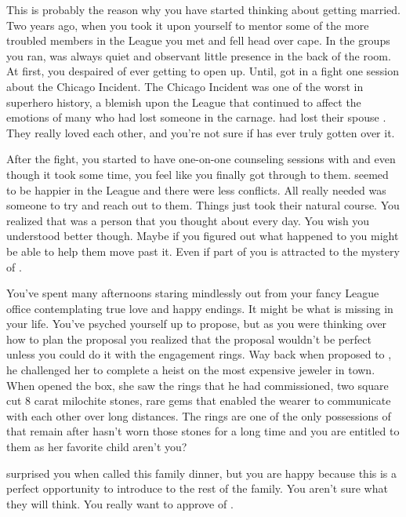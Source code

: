 \documentclass[char]{LRSguildcamp1}
\begin{document}
This is probably the reason why you have started thinking about getting married. Two years ago, when you took it upon yourself to mentor some of the more troubled members in the League you met \cYS{} and fell head over cape. In the groups you ran, \cYS{\they} was always quiet and observant little presence in the back of the room. At first, you despaired of ever getting \cYS{\them} to open up. Until, \cYS{\they} got in a fight one session about the Chicago Incident. The Chicago Incident was one of the worst in superhero history, a blemish upon the League that continued to affect the emotions of many who had lost someone in the carnage. \cArchitect{} had lost their spouse \cAS{\intro}. They really loved each other, and you're not sure if \cArchitect{\they} has ever truly gotten over it. 

After the fight, you started to have one-on-one counseling sessions with \cYS{} and even though it took some time, you feel like you finally got through to them. \cYS{} seemed to be happier in the League and there were less conflicts.  All \cYS{\they} really needed was someone to try and reach out to them. Things just took their natural course. You realized that \cYS{\they} was a person that you thought about every day. You wish you understood \cYS{\them} better though. Maybe if you figured out what happened to \cYS{\them} you might be able to help them move past it.  Even if part of you is attracted to the mystery of \cYS{\them}. 
 
You've spent many afternoons staring mindlessly out from your fancy League office contemplating true love and happy endings. It might be what is missing in your life. You've psyched yourself up to propose, but as you were thinking over how to plan the proposal you realized that the proposal wouldn't be perfect unless you could do it with the engagement rings. Way back when \cGS{\parent} proposed to \cGrandma{\parent}, he challenged her to complete a heist on the most expensive jeweler in town. When \cGrandma{\they} opened the box, she saw the rings that he had commissioned, two square cut 8 carat milochite stones, rare gems that enabled the wearer to communicate with each other over long distances. The rings are one of the only possessions of \GS{\parent} that remain after \cGS{\their} \cGrandma{\they} hasn't worn those stones for a long time and you are entitled to them as her favorite child aren't you? 

 \cGrandma{\parent} surprised you when \cGrandma{\they} called this family dinner, but you are happy because this is a perfect opportunity to introduce \cYS{} to the rest of the family. You aren't sure what they will think. You really want \cGrandma{\parent} to approve of \cYS{}. 
\end{document}
